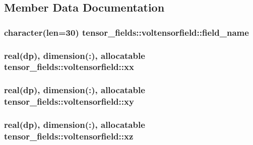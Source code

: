\subsection{Member Data Documentation}
\hypertarget{structtensor__fields_1_1voltensorfield_a5c38fb87b18b6ab313c6f23323d1ec94}{
\subsubsection[{field\-\_\-name}]{\setlength{\rightskip}{0pt plus 5cm}character(len=30) tensor\-\_\-fields\-::voltensorfield\-::field\-\_\-name}}\label{structtensor__fields_1_1voltensorfield_a5c38fb87b18b6ab313c6f23323d1ec94}
\hypertarget{structtensor__fields_1_1voltensorfield_a8221674d6d78a29bc3ccd870f588c74c}{
\subsubsection[{xx}]{\setlength{\rightskip}{0pt plus 5cm}real(dp), dimension(\-:), allocatable tensor\-\_\-fields\-::voltensorfield\-::xx}}\label{structtensor__fields_1_1voltensorfield_a8221674d6d78a29bc3ccd870f588c74c}
\hypertarget{structtensor__fields_1_1voltensorfield_af4b9355ff0748641d56386b83ea82fbe}{
\subsubsection[{xy}]{\setlength{\rightskip}{0pt plus 5cm}real(dp), dimension(\-:), allocatable tensor\-\_\-fields\-::voltensorfield\-::xy}}\label{structtensor__fields_1_1voltensorfield_af4b9355ff0748641d56386b83ea82fbe}
\hypertarget{structtensor__fields_1_1voltensorfield_a32b3cd65e4759d11907c7db6085188f8}{
\subsubsection[{xz}]{\setlength{\rightskip}{0pt plus 5cm}real(dp), dimension(\-:), allocatable tensor\-\_\-fields\-::voltensorfield\-::xz}}\label{structtensor__fields_1_1voltensorfield_a32b3cd65e4759d11907c7db6085188f8}
